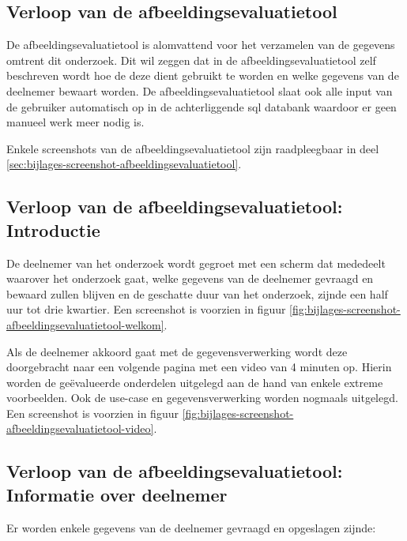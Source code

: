 \subsection{Verloop  van de afbeeldingsevaluatietool}
\label{sec:onderzoek-evaluatietool-verloop}

De \gls{afbeeldingsevaluatietool} is alomvattend voor het verzamelen van de gegevens omtrent dit onderzoek. Dit wil zeggen dat in de \gls{afbeeldingsevaluatietool} zelf beschreven wordt hoe de deze dient gebruikt te worden en welke gegevens van de deelnemer bewaart worden. De \gls{afbeeldingsevaluatietool} slaat ook alle input van de gebruiker automatisch op in de achterliggende \gls{sql} databank waardoor er geen manueel werk meer nodig is.

Enkele screenshots van de \gls{afbeeldingsevaluatietool} zijn raadpleegbaar in deel \ref{sec:bijlages-screenshot-afbeeldingsevaluatietool}.

\subsection{Verloop  van de afbeeldingsevaluatietool: Introductie}
\label{sec:onderzoek-evaluatietool-verloop-intro}

De deelnemer van het onderzoek wordt gegroet met een scherm dat mededeelt waarover het onderzoek gaat, welke gegevens van de deelnemer gevraagd en bewaard zullen blijven en de geschatte duur van het onderzoek, zijnde een half uur tot drie kwartier. Een screenshot is voorzien in figuur \ref{fig:bijlages-screenshot-afbeeldingsevaluatietool-welkom}.

Als de deelnemer akkoord gaat met de gegevensverwerking wordt deze doorgebracht naar een volgende pagina met een video van 4 minuten op. Hierin worden de geëvalueerde onderdelen uitgelegd aan de hand van enkele extreme voorbeelden. Ook de \gls{use-case} en gegevensverwerking worden nogmaals uitgelegd. Een screenshot is voorzien in figuur \ref{fig:bijlages-screenshot-afbeeldingsevaluatietool-video}.

\subsection{Verloop  van de afbeeldingsevaluatietool: Informatie over deelnemer}
\label{sec:onderzoek-evaluatietool-verloop-info-participant}

Er worden enkele gegevens van de deelnemer gevraagd en opgeslagen zijnde: 

